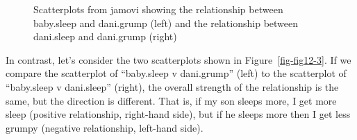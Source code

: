\documentclass[
  a4paper,
]{book}
\begin{document}
\begin{figure}
\begin{minipage}[b]{0.50\linewidth}
{}

\subcaption{\label{fig-fig12-2b}}
\end{minipage}%

\caption{\label{fig-fig12-2}Scatterplots from jamovi showing the
relationship between baby.sleep and dani.grump (left) and the
relationship between dani.sleep and dani.grump (right)}

\end{figure}

In contrast, let's consider the two scatterplots shown in
Figure~\ref{fig-fig12-3}. If we compare the scatterplot of ``baby.sleep
v dani.grump'' (left) to the scatterplot of ``baby.sleep v dani.sleep''
(right), the overall strength of the relationship is the same, but the
direction is different. That is, if my son sleeps more, I get more sleep
(positive relationship, right-hand side), but if he sleeps more then I
get less grumpy (negative relationship, left-hand side).
\end{document}

